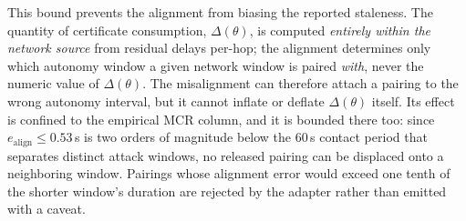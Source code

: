 This bound prevents the alignment from biasing the reported staleness. The quantity of certificate consumption, $\Delta(\theta)$, is computed \emph{entirely
within the network source} from residual delays per-hop; the alignment determines only which autonomy window a given network window is paired
\emph{with}, never the numeric value of $\Delta(\theta)$. The misalignment can therefore attach a pairing to the wrong autonomy interval, but it cannot inflate
or deflate $\Delta(\theta)$ itself. Its effect is confined to the empirical MCR
column, and it is bounded there too: since $e_{\mathrm{align}}\le0.53$\,s is two
orders of magnitude below the $60$\,s contact period that separates distinct
attack windows, no released pairing can be displaced onto a neighboring window.
Pairings whose alignment error would exceed one tenth of the shorter window's
duration are rejected by the adapter rather than emitted with a caveat.

